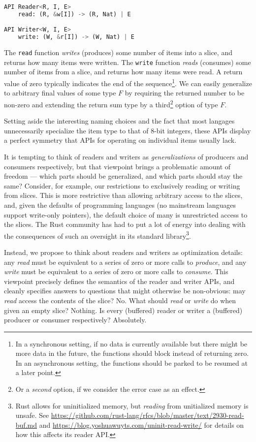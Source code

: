 \documentclass[sigplan,screen,10pt,review]{acmart}
\begin{document}
\begin{lstlisting}[language=Python]
API Reader<R, I, E>
    read: (R, &w[I]) -> (R, Nat) | E

API Writer<W, I, E>
    write: (W, &r[I]) -> (W, Nat) | E
\end{lstlisting}

The \texttt{read} function \textit{writes} (produces) some number of items into a slice, and returns how many items were written. The \texttt{write} function \textit{reads} (consumes) some number of items from a slice, and returns how many items were read. A return value of zero typically indicates the end of the sequence\footnote{In a synchronous setting, if no data is currently available but there might be more data in the future, the functions should block instead of returning zero. In an asynchronous setting, the functions should be parked to be resumed at a later point.}. We can easily generalize to arbitrary final values of some type $F$ by requiring the returned number to be non-zero and extending the return sum type by a third\footnote{Or a \textit{second} option, if we consider the error case as an effect.} option of type $F$.

Setting aside the interesting naming choices and the fact that most langages unnecessarily specialize the item type to that of 8-bit integers, these APIs display a perfect symmetry that APIs for operating on individual items usually lack.

It is tempting to think of readers and writers as \textit{generalizations} of producers and consumers respectively, but that viewpoint brings a problematic amount of freedom --- which parts should be generalized, and which parts should stay the same? Consider, for example, our restrictions to exclusively reading or writing from slices. This is more restrictive than allowing arbitrary access to the slices, and, given the defaults of programming languages (no mainstream languages support write-only pointers), the default choice of many is unrestricted access to the slices. The Rust community has had to put a lot of energy into  dealing with the consequences of such an oversight in its standard library\footnote{Rust allows for uninitialized memory, but \textit{reading} from unitialized memory is unsafe. See \url{https://github.com/rust-lang/rfcs/blob/master/text/2930-read-buf.md} and \url{https://blog.yoshuawuyts.com/uninit-read-write/} for details on how this affects its reader API.}.

Instead, we propose to think about readers and writers as optimization details: any \textit{read} must be equivalent to a series of zero or more calls to \textit{produce}, and any \textit{write} must be equivalent to a series of zero or more calls to \textit{consume}. This viewpoint precisely defines the semantics of the reader and writer APIs, and cleanly specifies answers to questions that might otherwise be non-obvious: may \textit{read} access the contents of the slice? No. What should \textit{read} or \textit{write} do when given an empty slice? Nothing. Is every (buffered) reader or writer a (buffered) producer or consumer respectively? Absolutely.
\end{document}
